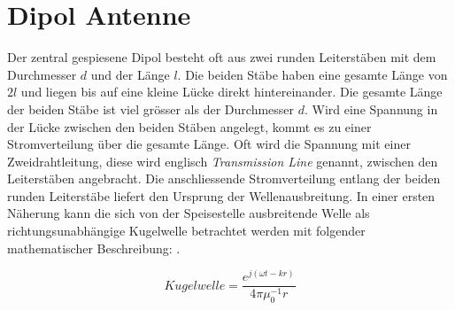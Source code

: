 
\section{Dipol Antenne}\label{sec:DipolAntenne}
Der zentral gespiesene Dipol besteht oft aus zwei runden Leiterstäben mit dem Durchmesser $d$ und der Länge $l$. Die beiden Stäbe haben eine gesamte Länge von $2l$ und liegen bis auf eine kleine Lücke direkt hintereinander. Die gesamte Länge der beiden Stäbe ist viel grösser als der Durchmesser $d$. Wird eine Spannung in der Lücke zwischen den beiden Stäben angelegt, kommt es zu einer Stromverteilung über die gesamte Länge. Oft wird die Spannung mit einer Zweidrahtleitung,  diese wird englisch \textit{Transmission Line} genannt, zwischen den Leiterstäben angebracht. Die anschliessende Stromverteilung entlang der beiden runden Leiterstäbe liefert den Ursprung der Wellenausbreitung. In einer ersten Näherung kann die sich von der Speisestelle ausbreitende Welle als richtungsunabhängige Kugelwelle betrachtet werden mit folgender mathematischer Beschreibung: \cite{elliott1981antenna}.

\begin{equation}\label{term:Kugelwelle}
Kugelwelle=\frac{e^{j(\omega t-kr)}}{4\pi \mu_{0}^{-1}r}
\end{equation}


